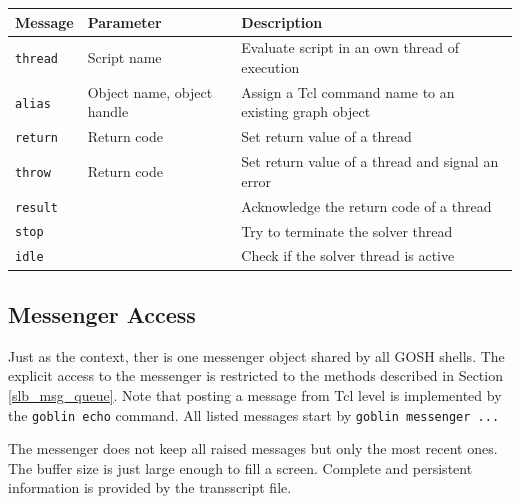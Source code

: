 \documentclass[a4paper,11pt,twoside]{book}
\begin{document}
\begin{center}
\begin{tabular}{|p{3cm}|p{6cm}|p{15.5cm}|}
\hline
{\bf Message}       & {\bf Parameter} & {\bf Description} \\
\hline
\hline
\verb/thread/ & Script name & Evaluate script in an own thread of execution \\
\hline
\verb/alias/  & Object name, object handle & Assign a Tcl command name
                      to an existing graph object \\
\hline
\verb/return/ & Return code & Set return value of a thread \\
\hline
\verb/throw/  & Return code & Set return value of a thread and signal an error \\
\hline
\verb/result/ & & Acknowledge the return code of a thread \\
\hline
\verb/stop/   & & Try to terminate the solver thread \\
\hline
\verb/idle/   & & Check if the solver thread is active \\
\hline
\end{tabular}
\end{center}
\bigskip


\subsection{Messenger Access}
\label{slb_messenger_access}
Just as the context, ther is one messenger object shared by all GOSH shells.
The explicit access to the messenger is restricted to the methods described in
Section \ref{slb_msg_queue}. Note that posting a message from Tcl level is
implemented by the \verb/goblin echo/ command. All listed messages start by
\verb/goblin messenger .../

The messenger does not keep all raised messages but only the most recent ones.
The buffer size is just large enough to fill a screen. Complete and persistent
information is provided by the transscript file.
\end{document}
